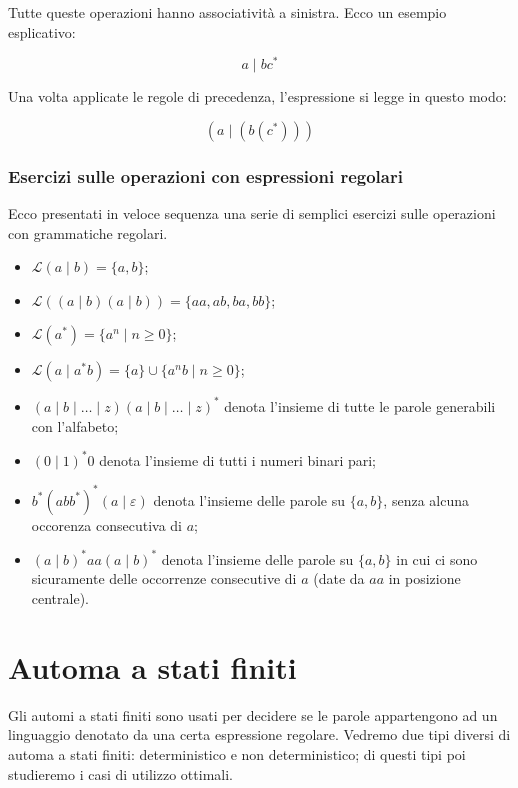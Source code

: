 \documentclass[class=book, crop=false, oneside, 12pt]{standalone}
\begin{document}
\noindent Tutte queste operazioni hanno associatività a sinistra.
Ecco un esempio esplicativo:

\begin{equation*}
    a \mid b c^\ast
\end{equation*}

\noindent Una volta applicate le regole di precedenza, l'espressione si legge in questo modo:

\begin{equation*}
    (a \mid ( b  ( c^\ast ) ) )
\end{equation*}    

\subsubsection{Esercizi sulle operazioni con espressioni regolari}
Ecco presentati in veloce sequenza una serie di semplici esercizi sulle operazioni con grammatiche regolari. 

\begin{itemize}
    \item \(\mathcal{L}(a \mid b) = \{a, b\}\);
    \item \(\mathcal{L}((a \mid b) (a \mid b)) = \{aa, ab, ba, bb\}\);
    \item \(\mathcal{L}(a^*) = \{a^n \mid n \ge 0\}\);
    \item \(\mathcal{L}(a \mid a^\ast b) = \{a\} \cup \{a^n b \mid n \ge 0\}\);
    \item \( (a \mid b \mid \ldots \mid z)(a \mid b \mid \ldots \mid z)^\ast \) denota l’insieme di tutte le parole generabili con l'alfabeto;
    \item \( (0 \mid 1)^\ast 0\) denota l’insieme di tutti i numeri binari pari;
    \item \( b^\ast (abb^\ast )^\ast ( a \mid \varepsilon ) \) denota l’insieme delle parole su \(\{a,b\} \), senza alcuna occorenza consecutiva di \(a\);
    \item \( (a \mid b)^\ast aa(a \mid b)^\ast \) denota l’insieme delle parole su \( \{a,b\} \) in cui ci sono sicuramente delle occorrenze consecutive di \(a\) (date da \(aa\) in posizione centrale).
\end{itemize}

\section{Automa a stati finiti}
Gli automi a stati finiti sono usati per decidere se le parole appartengono ad un linguaggio denotato da una certa espressione regolare.
Vedremo due tipi diversi di automa a stati finiti: deterministico e non deterministico; di questi tipi poi studieremo i casi di utilizzo ottimali.
\end{document}
